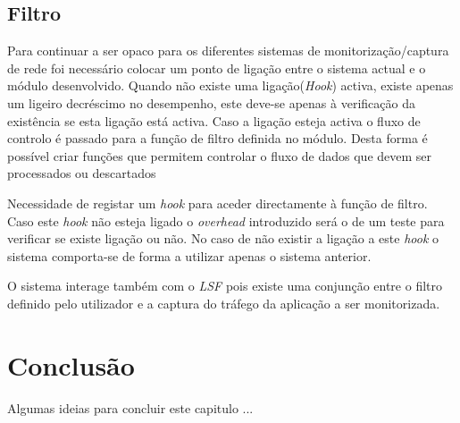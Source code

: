 \subsection{Filtro}

Para continuar a ser opaco para os diferentes sistemas de monitorização/captura de rede foi necessário colocar um ponto de ligação entre o sistema actual e o módulo desenvolvido.
 Quando não existe uma ligação(\textit{Hook}) activa, existe apenas um ligeiro decréscimo no desempenho, este deve-se apenas à verificação da existência se esta ligação está activa.
 Caso a ligação esteja activa o fluxo de controlo é passado para a função de filtro definida no módulo.
 Desta forma é possível criar funções que permitem controlar o fluxo de dados que devem ser processados ou descartados

Necessidade de registar um \textit{hook} para aceder directamente à função de filtro.
 Caso este \textit{hook} não esteja ligado o \textit{overhead} introduzido será o de um teste para verificar se existe ligação ou não.
 No caso de não existir a ligação a este \textit{hook} o sistema comporta-se de forma a utilizar apenas o sistema anterior.

O sistema interage também com o \textit{LSF} pois existe uma conjunção entre o filtro definido pelo utilizador e a captura do tráfego da aplicação a ser monitorizada.

\section{Conclusão}

Algumas ideias para concluir este capitulo ...

